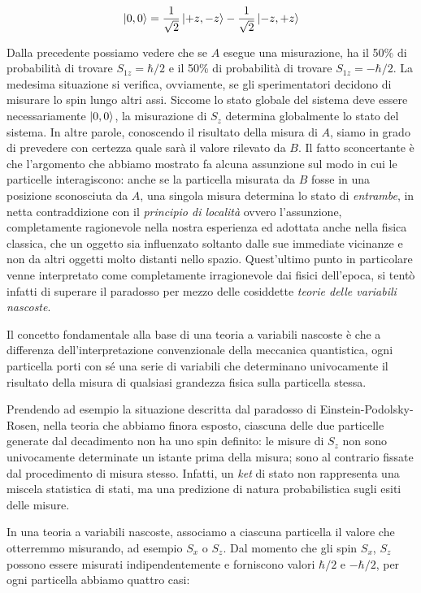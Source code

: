 	\[
		\ket{0, 0}  = \frac{1}{\sqrt{2}} \ket{+z, -z} - \frac{1}{\sqrt{2}} \ket{-z, +z}
	\]

Dalla precedente possiamo vedere che se $A$ esegue una misurazione, ha il 50\% di probabilit\`a di trovare $S_{1z} = \hbar / 2$ e il 50\% di probabilit\`a di trovare $S_{1z} = - \hbar / 2$. La medesima situazione si verifica, ovviamente, se gli sperimentatori decidono di misurare lo spin lungo altri assi. Siccome lo stato globale del sistema deve essere necessariamente $\ket{0, 0}$, la misurazione di $S_z$ determina globalmente lo stato del sistema. In altre parole, conoscendo il risultato della misura di $A$, siamo in grado di prevedere con certezza quale sar\`a il valore rilevato da $B$. Il fatto sconcertante \`e che l'argomento che abbiamo mostrato fa alcuna assunzione sul modo in cui le particelle interagiscono: anche se la particella misurata da $B$ fosse in una posizione sconosciuta da $A$, una singola misura determina lo stato di \textit{entrambe}, in netta contraddizione con il \textit{principio di localit\`a} ovvero l'assunzione, completamente ragionevole nella nostra esperienza ed adottata anche nella fisica classica, che un oggetto sia influenzato soltanto dalle sue immediate vicinanze e non da altri oggetti molto distanti nello spazio. 
Quest'ultimo punto in particolare venne interpretato come completamente irragionevole dai fisici dell'epoca, si tent\`o infatti di superare il paradosso per mezzo delle cosiddette \textit{teorie delle variabili nascoste}.

Il concetto fondamentale alla base di una teoria a variabili nascoste \`e che a differenza dell'interpretazione convenzionale della meccanica quantistica, ogni particella porti con s\'e una serie di variabili che determinano univocamente il risultato della misura di qualsiasi grandezza fisica sulla particella stessa.

Prendendo ad esempio la situazione descritta dal paradosso di Einstein-Podolsky-Rosen, nella teoria che abbiamo finora esposto, ciascuna delle due particelle generate dal decadimento non ha uno spin definito: le misure di $S_z$ non sono univocamente determinate un istante prima della misura; sono al contrario fissate dal procedimento di misura stesso. Infatti, un \textit{ket} di stato non rappresenta una miscela statistica di stati, ma una predizione di natura probabilistica sugli esiti delle misure.

In una teoria a variabili nascoste, associamo a ciascuna particella il valore che otterremmo misurando, ad esempio $S_x$ o $S_z$. Dal momento che gli spin $S_x$, $S_z$ possono essere misurati indipendentemente e forniscono valori $\hbar / 2$ e $-\hbar / 2$, per ogni particella abbiamo quattro casi:

